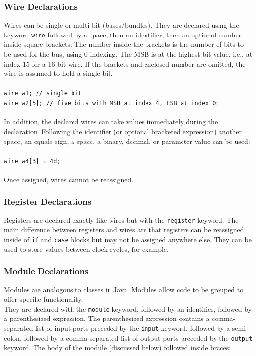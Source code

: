 \documentclass[letterpaper,11pt]{article}
\newcommand{\tab}{\hspace*{2em}}
\begin{document}
        \subsubsection{Wire Declarations}
        Wires can be single or multi-bit (buses/bundles).  They are declared using the keyword
        \texttt{wire} followed by a space, then an identifier, then an optional number inside
        square brackets.  The number inside the brackets is the number of bits to be used for the 
        bus, using 0-indexing.  The MSB is at the highest bit value, i.e., at index 15 for a 16-bit
        wire.  If the brackets and enclosed number are omitted, the wire is assumed to hold a
        single bit.\\\\
        \texttt{wire w1; \tab // single bit}\\
        \texttt{wire w2[5]; // five bits with MSB at index 4, LSB at index 0};\\\\
        In addition, the declared wires can take values immediately during the declaration. 
        Following the identifier (or optional bracketed expression) another space, an equals 
        sign, a space, a binary, decimal, or parameter value can be used:\\\\
        \texttt{wire w4[3] = 4d;}\\\\
        Once assigned, wires cannot be reassigned.\\
        
        \subsubsection{Register Declarations}
        Registers are declared exactly like wires but with the \texttt{register} keyword.
        The main difference between registers and wires are that registers can be reassigned 
        inside of \texttt{if} and \texttt{case} blocks but may not be assigned anywhere else.  They can be used to store values between clock 
        cycles, for example.\\
        
        \subsubsection{Module Declarations}
        Modules are analogous to classes in Java.  Modules allow code to be grouped to offer
        specific functionality.\\
        They are declared with the \texttt{module} keyword, followed by an identifier, followed by a
        parenthesized expression.  The parenthesized expression contains a comma-separated list of
        input ports preceded by the \texttt{input} keyword, followed by a semi-colon, followed by a
        comma-separated list of output ports preceded by the \texttt{output} keyword.  The body of
        the module (discussed below) followed inside braces:\\
        
\end{document}
